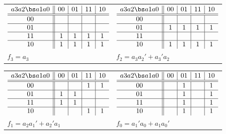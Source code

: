 \begin{enumerate}
\begin{itemize}
\begin{solution}{
\begin{tabular}{ll}
$\begin{array} {c||c|c|c|c}
 a3 a2 \bs a1 a0 & 00 & 01 & 11 & 10 \\ \hline \hline
       00        &    &    &    &    \\ \hline
       01        &    &    &    &    \\ \hline
       11        & 1  & 1  & 1  & 1  \\ \hline
       10        & 1  & 1  & 1  & 1  \\
\end{array}$ &
$\begin{array} {c||c|c|c|c}
 a3 a2 \bs a1 a0 & 00 & 01 & 11 & 10 \\ \hline \hline
       00        &    &    &    &    \\ \hline
       01        & 1  & 1  & 1  & 1  \\ \hline
       11        &    &    &    &    \\ \hline
       10        & 1  & 1  & 1  & 1  \\
\end{array} $ \\
$f_3 = a_3$ & $f_2 = a_3a_2'+a_3'a_2$\\
\end{tabular}
} \end{solution}


\begin{solution}{
\begin{tabular}{ll}
$\begin{array} {c||c|c|c|c}
 a3 a2 \bs a1 a0 & 00 & 01 & 11 & 10 \\ \hline \hline
       00        &    &    & 1  & 1  \\ \hline
       01        & 1  & 1  &    &    \\ \hline
       11        & 1  & 1  &    &    \\ \hline
       10        &    &    & 1  & 1  \\
\end{array}$ &
$\begin{array} {c||c|c|c|c}
 a3 a2 \bs a1 a0 & 00 & 01 & 11 & 10 \\ \hline \hline
       00        &    & 1  &    & 1  \\ \hline
       01        &    & 1  &    & 1  \\ \hline
       11        &    & 1  &    & 1  \\ \hline
       10        &    & 1  &    & 1  \\
\end{array}$ \\
$f_1 = a_2a_1'+a_2'a_1$ & $f_0 = a_1'a_0+a_1a_0'$ \\
\end{tabular}
} \end{solution}


\end{itemize}
\end{enumerate}
